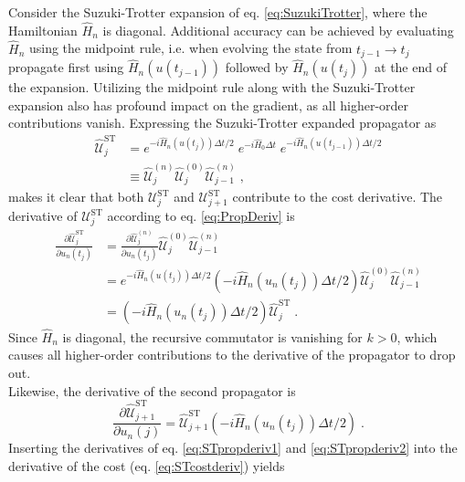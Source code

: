 \documentclass[%
 reprint,
 amsmath,amssymb,
 aps,
pra,
]{revtex4-1}
\begin{document}
Consider the Suzuki-Trotter expansion of eq. \eqref{eq:SuzukiTrotter}, where the Hamiltonian $\hat{H}_n$ is diagonal. Additional accuracy can be achieved by evaluating $\hat{H}_n$ using the midpoint rule, i.e. when evolving the state from $t_{j-1} \to t_j$ propagate first using $\hat{H}_n (u (t_{j-1}))$ followed by $\hat{H}_n (u (t_{j}))$ at the end of the expansion. Utilizing the midpoint rule along with the Suzuki-Trotter expansion also has profound impact on the  gradient, as all higher-order contributions vanish.
Expressing the Suzuki-Trotter expanded propagator as
\begin{align}
	\hat{\mathcal{U}}_{j}^{\mathrm{ST}} &= e^{ -i  \hat{H}_n (u (t_j)) \Delta t /2 } \; e^{ -i \hat{H}_0 \Delta t } \; e^{ -i  \hat{H}_n (u (t_{j-1}))  \Delta t /2 } \\
	& \equiv \hat{\mathcal{U}}_{j}^{(n)} \hat{\mathcal{U}}_{j}^{(0)} \hat{\mathcal{U}}_{j-1}^{(n)} \; , 
\end{align}
makes it clear that both $\mathcal{U}_{j}^{\mathrm{ST}}$ and $\mathcal{U}_{j+1}^{\mathrm{ST}}$ contribute to the cost derivative.
The derivative of $\mathcal{U}_{j}^{\mathrm{ST}}$ according to eq. \eqref{eq:PropDeriv} is
\begin{align}
	\frac{\partial \hat{\mathcal{U}}_{j}^{\mathrm{ST}}}{\partial u_n (t_j)} &=  \frac{\partial \hat{\mathcal{U}}_{j}^{(n)}}{\partial u_n (t_j)} \hat{\mathcal{U}}_{j}^{(0)} \hat{\mathcal{U}}_{j-1}^{(n)} \nonumber \\
	&= e^{ -i  \hat{H}_n (u (t_j)) \Delta t /2 } \left( -i \hat{H}_n (u_n (t_j)) \Delta t /2 \right) \hat{\mathcal{U}}_{j}^{(0)} \hat{\mathcal{U}}_{j-1}^{(n)} \nonumber \\
	&= \left( -i \hat{H}_n (u_n (t_j)) \Delta t /2 \right) \hat{\mathcal{U}}_{j}^{\mathrm{ST}} \; . \label{eq:STpropderiv1}
\end{align}
Since $\hat{H}_n$ is diagonal, the recursive commutator is vanishing for $k > 0$, which causes all higher-order contributions to the derivative of the propagator to drop out.\\
Likewise, the derivative of the second propagator is
\begin{equation}
	\frac{\partial \hat{\mathcal{U}}_{j+1}^{\mathrm{ST}}}{\partial u_n (j)} =  \hat{\mathcal{U}}_{j+1}^{\mathrm{ST}} \left( -i \hat{H}_n (u_n (t_j)) \Delta t /2 \right) \; . \label{eq:STpropderiv2}
\end{equation}
Inserting the derivatives of eq. \eqref{eq:STpropderiv1} and \eqref{eq:STpropderiv2} into the derivative of the cost (eq. \eqref{eq:STcostderiv}) yields
\end{document}
